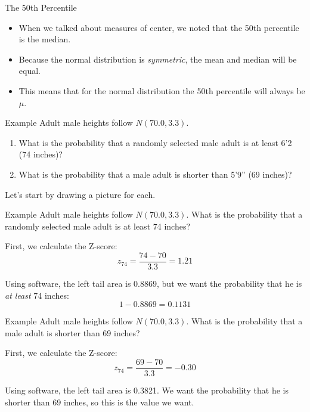 \begin{frame}{The 50th Percentile}
    \begin{itemize}
        \item When we talked about measures of center, we noted that the 50th percentile is the median.
        \item Because the normal distribution is \textit{symmetric}, the mean and median will be equal.
        \item This means that for the normal distribution the 50th percentile will always be $\mu$.
    \end{itemize}
\end{frame}

\begin{frame}{Example}
    Adult male heights follow $N(70.0,3.3)$.
    \begin{enumerate}
        \item What is the probability that a randomly selected male adult is at least 6’2 (74 inches)?
        \item What is the probability that a male adult is shorter than 5’9” (69 inches)?
    \end{enumerate}
    
    \vspace{12pt}Let's start by drawing a picture for each.
\end{frame}

\begin{frame}{Example}
    Adult male heights follow $N(70.0,3.3)$. What is the probability that a randomly selected male adult is at least 74 inches?
    
    \vspace{12pt}First, we calculate the Z-score:
    \[
        z_{74}=\frac{74-70}{3.3}=1.21
    \]
    
    Using software, the left tail area is 0.8869, but we want the probability that he is \textit{at least} 74 inches:
    \[
    1-0.8869 =0.1131
    \]
\end{frame}

\begin{frame}{Example}
    Adult male heights follow $N(70.0,3.3)$. What is the probability that a male adult is shorter than 69 inches?
    
    \vspace{12pt}First, we calculate the Z-score:
    \[
        z_{74}=\frac{69-70}{3.3}=-0.30
    \]
    
    Using software, the left tail area is 0.3821. We want the probability that he is shorter than 69 inches, so this is the value we want.
\end{frame}

